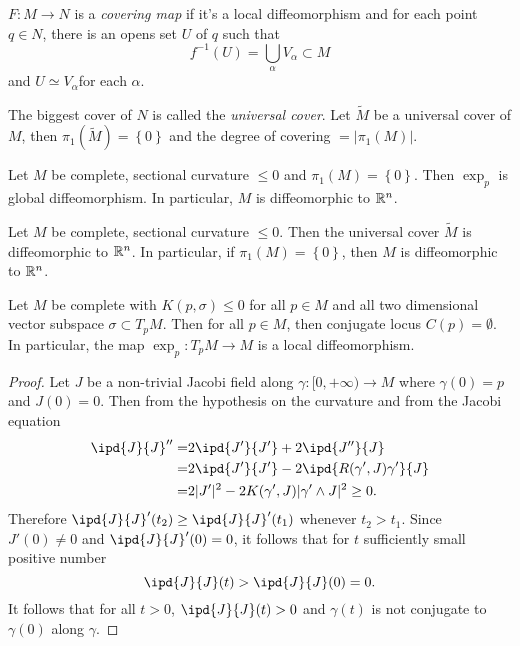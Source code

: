 \begin{definition}
  $F:M\to N$ is a \textit{covering map} if it's a local diffeomorphism and for each point $q\in N$, there is an opens set $U$ of $q$ such that 
  \[
    f^{-1}(U)=\bigcup_{\alpha} V_\alpha\subset M
  \] and $U\simeq V_\alpha$for each $\alpha$.
\end{definition}
The biggest cover of $N$ is called the \textit{universal cover}. Let $\widetilde{M}$ be a universal cover of $M$, then $\pi_1(\widetilde{M})=\left\{0\right\} $ and the degree of covering $=\left| \pi_1(M) \right| $.

\begin{theorem}[Hadamard]
  Let $M$ be complete, sectional curvature $\le 0$ and $\pi_1(M)=\left\{0\right\} $. Then $\exp_p$ is global diffeomorphism. In particular, $M$ is diffeomorphic to $\mathbb{R}^{n}$.
\end{theorem}
\begin{corollary}
  Let $M$ be complete, sectional curvature $\le 0$. Then the universal cover $\widetilde{M}$ is diffeomorphic to $\mathbb{R}^{n}$. In particular, if $\pi_1(M)=\left\{0\right\} $, then $M$ is diffeomorphic to $\mathbb{R}^{n}$. 
\end{corollary}

\begin{lemma}\label{lma-1}
  Let $M$ be complete with $K(p,\sigma)\le 0$ for all $p\in M$ and all two dimensional vector subspace $\sigma\subset T_pM$. Then for all $p\in M$, then conjugate locus $C(p)=\emptyset$. In particular, the map $\exp_p :T_pM\to M$ is a local diffeomorphism.
\end{lemma}
  \begin{proof}
    Let $J$ be a non-trivial Jacobi field along $\gamma:[0,+\infty)\to M$ where $\gamma(0)=p$ and $J(0)=0$. Then from the hypothesis on the curvature and from the Jacobi equation
    \begin{align*}
      \ipd{J}{J}''=&2\ipd{J'}{J'}+2\ipd{J''}{J}\\
      =& 2\ipd{J'}{J'}-2\ipd{R(\gamma',J)\gamma'}{J}\\
      =&2|J'|^2-2K(\gamma',J)|\gamma'\wedge J|^2\ge 0
    .\end{align*}
    Therefore $\ipd{J}{J}'(t_2)\ge \ipd{J}{J}'(t_1)$ whenever $t_2>t_1$. Since $J'(0)\neq 0$ and $\ipd{J}{J}'(0)=0$, it follows that for $t$ sufficiently small positive number
    \[
      \ipd{J}{J}(t)>\ipd{J}{J}(0)=0.
    \] 
    It follows that for all $t>0$, $\ipd{J}{J}(t)>0$ and $\gamma(t)$ is not conjugate to $\gamma(0)$ along $\gamma$. 
  \end{proof}

